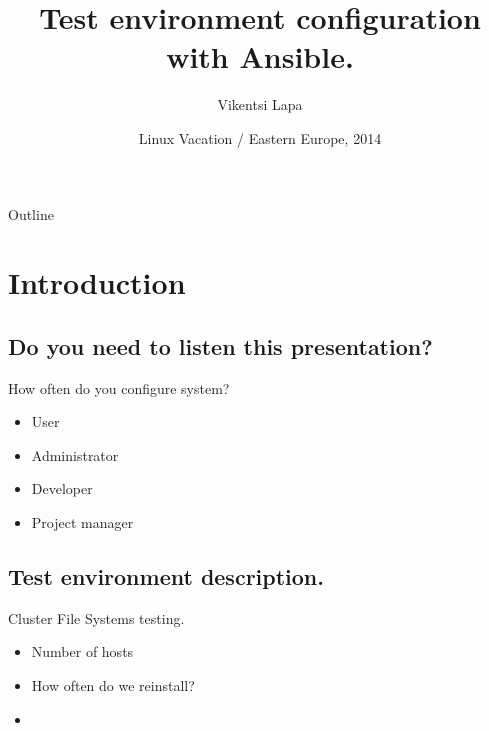 \documentclass{beamer}
\title %
{Test environment configuration with Ansible.}
\author[Lapa] %
{Vikentsi Lapa\inst{1}}
\institute[EPAM Systems] %
\date[LVEE 2014] %
{ Linux Vacation / Eastern Europe, 2014}
\begin{document}
\begin{frame}
  \titlepage
\end{frame}

\begin{frame}{Outline}
  \tableofcontents
\end{frame}





\section{Introduction}

\subsection{Do you need to listen this presentation? }

\begin{frame}{How often do you configure system?}

  \begin{itemize}
  \item
     User 
  \item
     Administrator
  \item
     Developer
  \item
     Project manager
  \end{itemize}
\end{frame}

\subsection{Test environment description.}

\begin{frame}{Cluster File Systems testing.}
  \begin{itemize}
  \item
  Number of hosts
  \item
  How often do we reinstall?
  \item
  \end{itemize}
\end{frame}
\end{document}
